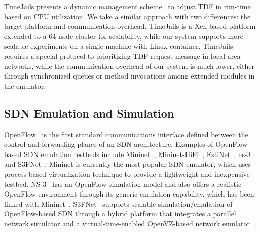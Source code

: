 TimeJails \cite{TimeJails} presents a dynamic management scheme~\cite{NtwkEmultAdaptVirtTime} to adjust TDF in run-time based on CPU utilization. 
We take a similar approach with two differences: the target platform and communication overhead.
TimeJails is a Xen-based platform extended to a 64-node cluster for scalability,
while our system supports more scalable experiments on a single machine with Linux container.
TimeJails requires a special protocol to prioritizing TDF request message in local area networks,
while the communication overhead of our system is much lower, either through synchronized queues or method invocations among extended modules in the emulator.

\subsection{SDN Emulation and Simulation}
OpenFlow~\cite{Openflow} is the first standard communications interface defined between the control and forwarding planes of an SDN architecture. 
Examples of OpenFlow-based SDN emulation testbeds include Mininet~\cite{LaptopSDN},
Mininet-HiFi~\cite{ReproNetExprCBE}, EstiNet~\cite{EstiNet}, ns-3~\cite{NS-3} and S3FNet~\cite{jin2013parallel}.
Mininet is currently the most popular SDN emulator, which uses process-based virtualization technique to provide a lightweight and inexpensive testbed. 
NS-3~\cite{NS-3} has an OpenFlow simulation model and also offers a realistic OpenFlow environment through its generic emulation capability,
which has been linked with Mininet~\cite{MininetLinkNS3}. 
S3FNet~\cite{jin2013parallel} supports scalable simulation/emulation of OpenFlow-based SDN through
a hybrid platform that integrates a parallel network simulator and a virtual-time-enabled OpenVZ-based network emulator~\cite{S3FWebsite}.

